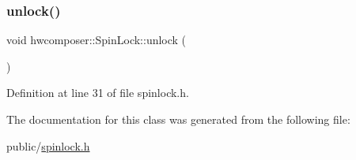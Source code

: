 \begin{DoxyCode}{0}
\end{DoxyCode}
\mbox{\label{classhwcomposer_1_1SpinLock_ae5cf624b4f0ec710833ce44e945b85d7}} 
\subsubsection{\texorpdfstring{unlock()}{unlock()}}
{\footnotesize\ttfamily void hwcomposer\+::\+Spin\+Lock\+::unlock (\begin{DoxyParamCaption}{ }\end{DoxyParamCaption})\hspace{0.3cm}{\ttfamily [inline]}}



Definition at line 31 of file spinlock.\+h.


\begin{DoxyCode}{0}
\end{DoxyCode}


The documentation for this class was generated from the following file\+:\begin{DoxyCompactItemize}
\item 
public/\mbox{\hyperlink{spinlock_8h}{spinlock.\+h}}\end{DoxyCompactItemize}
